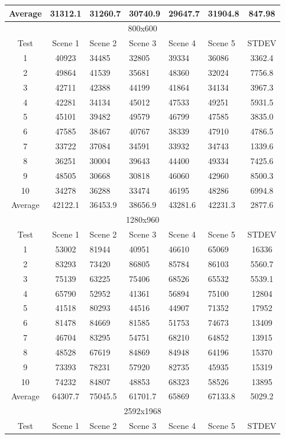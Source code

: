 \begin{table}
\begin{tabular}{| c | c | l | l | l | l | c | }
Average	&31312.1	&31260.7	&30740.9	&29647.7	&31904.8	&847.98\\
\hline
 \hline 
\multicolumn{7}{|c|}{800x600}\\
\hline
Test	&Scene 1	&Scene 2	&Scene 3	&Scene 4	&Scene 5	&STDEV\\\hline
1	&40923	&34485	&32805	&39334	&36086	&3362.4\\
2	&49864	&41539	&35681	&48360	&32024	&7756.8\\
3	&42711	&42388	&44199	&41864	&34134	&3967.3\\
4	&42281	&34134	&45012	&47533	&49251	&5931.5\\
5	&45101	&39482	&49579	&46799	&47585	&3835.0\\
6	&47585	&38467	&40767	&38339	&47910	&4786.5\\
7	&33722	&37084	&34591	&33932	&34743	&1339.6\\
8	&36251	&30004	&39643	&44400	&49334	&7425.6\\
9	&48505	&30668	&30818	&46060	&42960	&8500.3\\
10	&34278	&36288	&33474	&46195	&48286	&6994.8\\\hline
Average	&42122.1	&36453.9	&38656.9	&43281.6	&42231.3	&2877.6\\
\hline
 \hline 
\multicolumn{7}{|c|}{1280x960}\\
\hline
Test	&Scene 1	&Scene 2	&Scene 3	&Scene 4	&Scene 5	&STDEV\\\hline
1	&53002	&81944	&40951	&46610	&65069	&16336\\
2	&83293	&73420	&86805	&85784	&86103	&5560.7\\
3	&75139	&63225	&75406	&68526	&65532	&5539.1\\
4	&65790	&52952	&41361	&56894	&75100	&12804\\
5	&41518	&80293	&44516	&44907	&71352	&17952\\
6	&81478	&84669	&81585	&51753	&74673	&13409\\
7	&46704	&83295	&54751	&68210	&64852	&13915\\
8	&48528	&67619	&84869	&84948	&64196	&15370\\
9	&73393	&78231	&57920	&82735	&45935	&15319\\
10	&74232	&84807	&48853	&68323	&58526	&13895\\\hline
Average	&64307.7	&75045.5	&61701.7	&65869	&67133.8	&5029.2\\
\hline
 \hline 
\multicolumn{7}{|c|}{2592x1968}\\
\hline
Test	&Scene 1	&Scene 2	&Scene 3	&Scene 4	&Scene 5	&STDEV\\\hline

\end{tabular}
\end{table}
